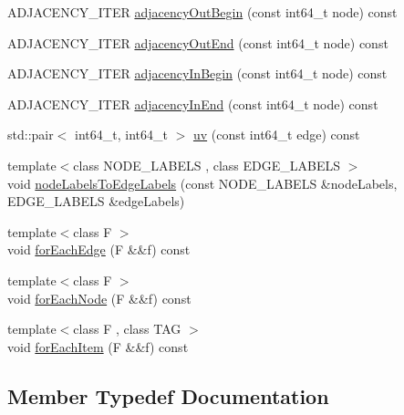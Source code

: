 \begin{DoxyCompactItemize}
A\+D\+J\+A\+C\+E\+N\+C\+Y\+\_\+\+I\+T\+ER \hyperlink{classnifty_1_1graph_1_1UndirectedGraphBase_ad429bbbbb9ee0addfa19bb642f950356}{adjacency\+Out\+Begin} (const int64\+\_\+t node) const
\item 
A\+D\+J\+A\+C\+E\+N\+C\+Y\+\_\+\+I\+T\+ER \hyperlink{classnifty_1_1graph_1_1UndirectedGraphBase_a074b4246bb62d8f6e57d913126709831}{adjacency\+Out\+End} (const int64\+\_\+t node) const
\item 
A\+D\+J\+A\+C\+E\+N\+C\+Y\+\_\+\+I\+T\+ER \hyperlink{classnifty_1_1graph_1_1UndirectedGraphBase_a89a51da8736b59edacd6127e366019ce}{adjacency\+In\+Begin} (const int64\+\_\+t node) const
\item 
A\+D\+J\+A\+C\+E\+N\+C\+Y\+\_\+\+I\+T\+ER \hyperlink{classnifty_1_1graph_1_1UndirectedGraphBase_a389da3c388ff86eba5434b1999687e67}{adjacency\+In\+End} (const int64\+\_\+t node) const
\item 
std\+::pair$<$ int64\+\_\+t, int64\+\_\+t $>$ \hyperlink{classnifty_1_1graph_1_1UndirectedGraphBase_a8d444cdff1ec4d0a8e276f15ce269e3f}{uv} (const int64\+\_\+t edge) const
\item 
{\footnotesize template$<$class N\+O\+D\+E\+\_\+\+L\+A\+B\+E\+LS , class E\+D\+G\+E\+\_\+\+L\+A\+B\+E\+LS $>$ }\\void \hyperlink{classnifty_1_1graph_1_1UndirectedGraphBase_a4b3cb925bbce09bea0ceeede5c04c4a1}{node\+Labels\+To\+Edge\+Labels} (const N\+O\+D\+E\+\_\+\+L\+A\+B\+E\+LS \&node\+Labels, E\+D\+G\+E\+\_\+\+L\+A\+B\+E\+LS \&edge\+Labels)
\item 
{\footnotesize template$<$class F $>$ }\\void \hyperlink{classnifty_1_1graph_1_1UndirectedGraphBase_a8c3d0036b084ef7463544b822835d446}{for\+Each\+Edge} (F \&\&f) const
\item 
{\footnotesize template$<$class F $>$ }\\void \hyperlink{classnifty_1_1graph_1_1UndirectedGraphBase_acf69fdb47f3729d55311adab5a6b97ef}{for\+Each\+Node} (F \&\&f) const
\item 
{\footnotesize template$<$class F , class T\+AG $>$ }\\void \hyperlink{classnifty_1_1graph_1_1UndirectedGraphBase_acfc8a7b6851e1ae726211911d84d309a}{for\+Each\+Item} (F \&\&f) const
\end{DoxyCompactItemize}


\subsection{Member Typedef Documentation}
\mbox{\label{classnifty_1_1graph_1_1UndirectedGraphBase_af2541cf9fb91440ff0a7b56dd5a6be29}} 
